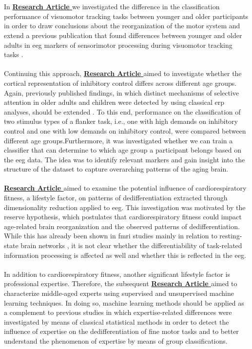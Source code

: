 \\
\\
In \textbf{\hyperref[pub:paperI]{Research Article }} we investigated the difference in the classification performance of visuomotor tracking tasks between younger and older participants in order to draw conclusions about the reorganization of the motor system and extend a previous publication that found differences between younger and older adults in \gls{eeg} markers of sensorimotor processing during visuomotor tracking tasks \cite{vieluf2018age}.\\
\\
Continuing this approach, \textbf{\hyperref[pub:paperII]{Research Article }} aimed to investigate whether the cortical representation of inhibitory control differs across different age groups. Again, previously published findings, in which distinct mechanisms of selective attention in older adults and children were detected by using classical \gls{erp} analyses, should be extended \cite{Reuter2019}. To this end, performance on the classification of two stimulus types of a flanker task, i.e., one with high demands on inhibitory control and one with low demands on inhibitory control, were compared between different age groups.Furthermore, it was investigated whether we can train a classifier that can determine to which age group a participant belongs based on the \gls{eeg} data. The idea was to identify relevant markers and gain insight into the structure of the dataset to capture overarching patterns of the aging brain.\\
\\
\textbf{\hyperref[pub:paperIII]{Research Article }} aimed to examine the potential influence of cardiorespiratory fitness, a lifestyle factor, on patterns of dedifferentiation extracted through dimensionality reduction applied to \gls{eeg}. This investigation was motivated by the reserve hypothesis, which postulates that cardiorespiratory fitness could impact age-related brain reorganization and the observed patterns of dedifferentiation. While this has already been shown in \gls{fmri} studies mainly in relation to resting-state brain networks \cite{Stillman2019}, it is not clear whether the differentiability of task-related information processing is affected as well and whether this is reflected in the \gls{eeg}.\\
\\
In addition to cardiorespiratory fitness, another significant lifestyle factor is professional expertise. Therefore, the subsequent \textbf{\hyperref[pub:paperIV]{Research Article }} aimed to characterize middle-aged experts using supervised and unsupervised machine learning techniques. In doing so, machine learning methods should be applied as a complement to previous studies in which expertise-related differences were investigated by means of classical statistical methods \cite{vieluf2018age, Goelz2018} in order to detect the influence of expertise on the dedifferentiation of fine motor tasks and to better understand the phenomenon of expertise by means of group classifications.\\

